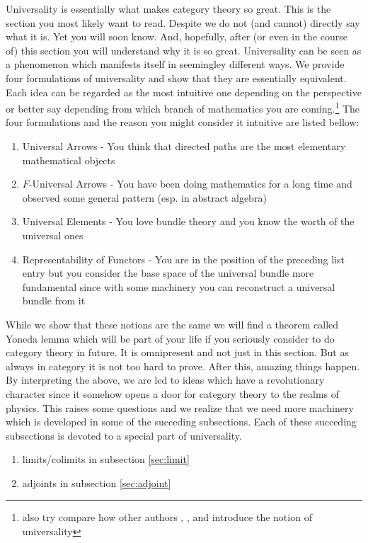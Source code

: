Universality is essentially what makes category theory so great. This is the section you most likely want to read. Despite we do not (and cannot) directly say what it is. Yet you will soon know. And, hopefully, after (or even in the course of) this section you will understand why it is so great. Universality can be seen as a phenomenon which manifests itself in seemingley different ways. We provide four formulations of universality and show that they are essentially equivalent. Each idea can be regarded as the most intuitive one depending on the perspective or better say depending from which branch of mathematics you are coming.\footnote{also try compare how other authors \cite{e837ef86}, \cite{52fbba46}, \cite{dc6f686f} and \cite{wiki-nlab0000} introduce the notion of universality} The four formulations and the reason you might consider it intuitive are listed bellow:
\begin{enumerate}
\item[(1)]
Universal Arrows - You think that directed paths are the most elementary mathematical objects
\item[(2)]
$F$-Universal Arrows - You have been doing mathematics for a long time and observed some general pattern (esp. in abstract algebra)
\item[(3)]
Universal Elements - You love bundle theory and you know the worth of the universal ones
\item[(4)]
Representability of Functors - You are in the position of the preceding list entry but you consider the base space of the universal bundle more fundamental since with some machinery you can reconstruct a universal bundle from it
\end{enumerate}
While we show that these notions are the same we will find a theorem called Yoneda lemma which will be part of your life if you seriously consider to do category theory in future. It is omnipresent and not just in this section. But as always in category it is not too hard to prove. After this, amazing things happen. By interpreting the above, we are led to ideas which have a revolutionary character since it somehow opens a door for category theory to the realms of physics. This raises some questions and we realize that we need more machinery which is developed in some of the succeding subsections. Each of these succeding subsections is devoted to a special part of universality.
\begin{enumerate}
\item[$\bullet$]
limits/colimits in subsection \ref{sec:limit}
\item[$\bullet$]
adjoints in subsection \ref{sec:adjoint}
\end{enumerate}
